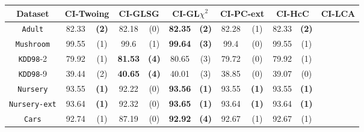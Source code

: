     \begin{table}
    \small
      \centering

\begin{tabular}{c|cc|cc|cc|cc|cc|cc} 
Dataset             & \multicolumn{2}{c|}{CI-Twoing} &   \multicolumn{2}{c|}{CI-GLSG} & \multicolumn{2}{c|}{CI-GL$\chi^2$} & \multicolumn{2}{c|}{CI-PC-ext}& \multicolumn{2}{c|}{CI-HcC}& \multicolumn{2}{c}{CI-LCA}\\
\hline   
{\tt Adult}         & 82.33      &  {\bf (2)}        &   82.18      & (0)             & {\bf 82.35} &  {\bf (2)}           & 82.28       & (1)             & 82.33       & {\bf (2)}   &             &             \\
{\tt Mushroom}      & 99.55      &  (1)              &   99.6       & (1)             & {\bf 99.64} &  {\bf (3)}           & 99.4        & (0)             & 99.55       & (1)         &             &             \\
{\tt KDD98}-2       & 79.92      &  (1)              &  {\bf 81.53} & {\bf (4)}       &  80.65      &  (3)                 & 79.72       & (0)             & 79.92       & (1)         &             &             \\
{\tt KDD98}-9       & 39.44      &  (2)              &  {\bf 40.65} & {\bf (4)}       &  40.01      &  (3)                 & 38.85       & (0)             & 39.07       & (0)         &             &             \\
{\tt Nursery}       & 93.55      &  {\bf (1)}        &   92.22      & (0)             & {\bf 93.56} &  {\bf (1)}           & 93.55       & {\bf (1)}       & 93.55       & {\bf (1)}   &             &             \\
{\tt Nursery-ext}   & 93.64      &  {\bf (1)}        &   92.32      & (0)             & {\bf 93.65} &  {\bf (1)}           & 93.64       & {\bf (1)}       & 93.64       & {\bf (1)}   &             &             \\
{\tt Cars}          & 92.74      &  (1)              &   87.19      & (0)             & {\bf 92.92} &  {\bf (4)}           & 92.67       & (1)             & 92.67       & (1)         &             &             \\

\end{tabular}
\end{table}
